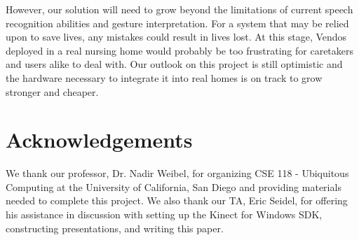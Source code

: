 \documentclass{chi-ext}
\begin{document}
However, our solution will need to grow beyond the limitations of current speech recognition abilities and gesture interpretation.
For a system that may be relied upon to save lives, any mistakes could result in lives lost.
At this stage, Vendos deployed in a real nursing home would probably be too frustrating for caretakers and users alike to deal with.
Our outlook on this project is still optimistic and the hardware necessary to integrate it into real homes is on track to grow stronger and cheaper.

\section{Acknowledgements}

We thank our professor, Dr. Nadir Weibel, for organizing CSE 118 - Ubiquitous Computing at the University of California, San Diego and providing materials needed to complete this project.
We also thank our TA, Eric Seidel, for offering his assistance in discussion with setting up the Kinect for Windows SDK, constructing presentations, and writing this paper.

\balance


\end{document}
